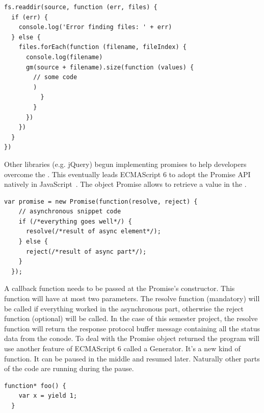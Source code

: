 \documentclass[11pt, a4paper, twoside, openright, openany]{article}
\begin{document}
\begin{lstlisting}[caption={Example of Callback Hell with its typical pyramid shape}, captionpos=b]
  fs.readdir(source, function (err, files) {
  if (err) {
    console.log('Error finding files: ' + err)
  } else {
    files.forEach(function (filename, fileIndex) {
      console.log(filename)
      gm(source + filename).size(function (values) {
        // some code
        )
          }
        }
      })
    })
  }
})
\end{lstlisting}

Other libraries (e.g. jQuery) begun implementing promises to help developers overcome the .
This eventually leads ECMAScript 6 to adopt the Promise API~\cite{promise} natively in JavaScript~\cite{ecmaPromise}.
The object Promise allows to retrieve a value in the .
\bigbreak

\begin{lstlisting}[caption={Structure of a Promise}, captionpos=b]
  var promise = new Promise(function(resolve, reject) {
    // asynchronous snippet code
    if (/*everything goes well*/) {
      resolve(/*result of async element*/);
    } else {
      reject(/*result of async part*/);
    }
  });
\end{lstlisting}

A callback function needs to be passed at the Promise's constructor. This function
will have at most two parameters. The resolve function (mandatory) will be called
if everything worked in the asynchronous part, otherwise the reject function (optional)
will be called.
\newline
In the case of this semester project, the resolve function will return the response
protocol buffer message containing all the status data from the conode.
\newline \newline
To deal with the Promise object returned the program will use another feature of ECMAScript 6
called a Generator. It's a new kind of function. It can be paused in the middle and
resumed later. Naturally other parts of the code are running during the pause.
\bigbreak

\begin{lstlisting}[caption={Structure of a generator function}, captionpos=b]
  function* foo() {
    var x = yield 1;
  }
  \end{lstlisting}
\end{document}
